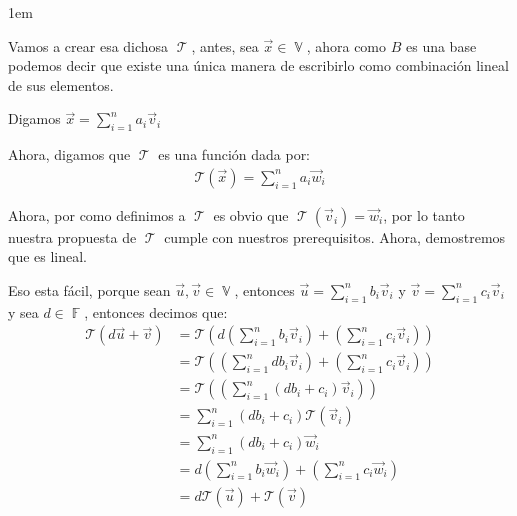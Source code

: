 \documentclass[12pt, fleqn]{report}                             %
\newenvironment{SmallIndentation}[1][0.75em]                    %
        {\begin{adjustwidth}{#1}{}\begin{footnotesize}}             %
        {\end{footnotesize}\end{adjustwidth}}                       %
\theoremstyle{break}                                            %
\DeclareMathOperator \GenericField {\mathbb{F}}                 %
\DeclareMathOperator \VectorSet    {\mathbb{V}}                 %
\DeclareMathOperator \LinTrans {\mathcal{T}}                    %
\newcommand{\Wrap}[1]    {\left( #1 \right)}                    %
\newcommand{\FnLinTrans}[1]{\mathcal{T}\Wrap{#1}}               %
\begin{document}
\begin{itemize}
\begin{SmallIndentation}[1em]
                            Vamos a crear esa dichosa $\LinTrans$, antes, sea $\vec x \in \VectorSet$, ahora
                            como $B$ es una base podemos decir que existe una única manera de escribirlo
                            como combinación lineal de sus elementos. 

                            Digamos $\displaystyle \vec x = \sum_{i=1}^n a_i \vec v_i$

                            Ahora, digamos que $\LinTrans$ es una función dada por:
                            \begin{align*}
                                \FnLinTrans{\vec x} = \sum_{i=1}^n a_i \vec w_i
                            \end{align*}
                            
                            Ahora, por como definimos a $\LinTrans$ es obvio que $\LinTrans(\vec v_i) = \vec w_i$, por
                            lo tanto nuestra propuesta de $\LinTrans$ cumple con nuestros prerequisitos.
                            Ahora, demostremos que es lineal.

                            Eso esta fácil, porque sean $\vec u, \vec v \in \VectorSet$, entonces
                            $\vec u = \sum_{i=1}^n b_i \vec v_i$ y $\vec v = \sum_{i=1}^n c_i \vec v_i$
                            y sea $d \in \GenericField$, entonces decimos que:
                            \begin{align*}
                                \FnLinTrans{d \vec u + \vec v}
                                    &= \FnLinTrans{d \Wrap{\sum_{i=1}^n b_i \vec v_i} + \Wrap{\sum_{i=1}^n c_i \vec v_i}}   \\ 
                                    &= \FnLinTrans{\Wrap{\sum_{i=1}^n db_i \vec v_i} + \Wrap{\sum_{i=1}^n c_i \vec v_i}}    \\ 
                                    &= \FnLinTrans{\Wrap{\sum_{i=1}^n (db_i + c_i) \vec v_i}}                               \\ 
                                    &= \sum_{i=1}^n (db_i + c_i) \FnLinTrans{\vec v_i}                                      \\ 
                                    &= \sum_{i=1}^n (db_i + c_i) \vec w_i                                                   \\ 
                                    &= d\Wrap{\sum_{i=1}^n b_i \vec w_i} + \Wrap{\sum_{i=1}^n c_i \vec w_i}                 \\ 
                                    &= d\FnLinTrans{\vec u} + \FnLinTrans{\vec v}    
                            \end{align*}


\end{SmallIndentation}
\end{itemize}
\end{document}
